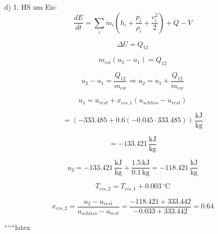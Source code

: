 d) 1. HS um Eis:
\begin{equation}
\frac{dE}{dt} = \sum_i \dot{m}_i (h_i + \frac{p_i}{\rho_i} + \frac{v_i^2}{2}) + \dot{Q} - \dot{V}
\end{equation}

\begin{equation}
\Delta U = Q_{12}
\end{equation}

\begin{equation}
m_{ew} (u_2 - u_1) = Q_{12}
\end{equation}

\begin{equation}
u_2 - u_1 = \frac{Q_{12}}{m_{ew}} \Rightarrow u_2 = u_1 + \frac{Q_{12}}{m_{ew}}
\end{equation}

\begin{equation}
u_1 = u_{rest} + x_{eis,1} (u_{schliss} - u_{rest})
\end{equation}

\begin{equation}
= (-333.485 + 0.6 (-0.045 \cdot 333.485)) \, \frac{\text{kJ}}{\text{kg}}
\end{equation}

\begin{equation}
= -133.421 \, \frac{\text{kJ}}{\text{kg}}
\end{equation}

\begin{equation}
u_2 = -133.421 \, \frac{\text{kJ}}{\text{kg}} + \frac{1.5 \, \text{kJ}}{0.1 \, \text{kg}} = -118.421 \, \frac{\text{kJ}}{\text{kg}}
\end{equation}

\begin{equation}
T_{eis,2} = T_{eis,1} + 0.003 \, ^\circ \text{C}
\end{equation}

\begin{equation}
x_{eis,2} = \frac{u_2 - u_{rest}}{u_{schliss} - u_{rest}} = \frac{-118.421 + 333.442}{-0.033 + 333.442} = 0.64
\end{equation}

``````latex